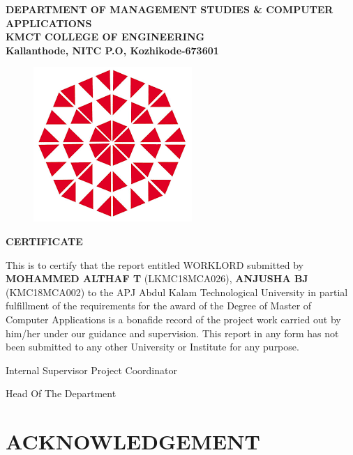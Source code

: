 \documentclass[a4paper,12pt]{report}
\begin{document}
\pagebreak

\begin{center}
	
\textbf{
\vspace*{8pt}
DEPARTMENT OF MANAGEMENT STUDIES \& COMPUTER
\vspace*{8pt}
APPLICATIONS\\
KMCT COLLEGE OF ENGINEERING\\
\vspace*{8pt}
Kallanthode, NITC P.O, Kozhikode-673601
}

\begin{figure}[bph]
	\centering
	\includegraphics[width=0.3023\linewidth]{kmct}
	\label{fig:ksblogo}
\end{figure}
\end{center}

{\centering \bf \large
	CERTIFICATE\par
}
\vspace*{10pt}
This is to certify that the report entitled WORKLORD submitted
by {\bf MOHAMMED ALTHAF T} (LKMC18MCA026), {\bf ANJUSHA BJ}
(KMC18MCA002) to the APJ Abdul Kalam Technological University
in partial fulfillment of the requirements for the award of the Degree of Master of Computer
Applications is a bonafide record of the project work carried out by him/her under our guidance and
supervision. This report in any form has not been submitted to any other University or Institute for
any purpose.

\begin{center}\vspace*{20pt}
	Internal Supervisor \hspace*{0pt} \hfill  Project Coordinator
\end{center}

\begin{center}\vspace*{40pt}
 \hfill  Head Of The Department
\end{center}
	
\pagebreak

\section*{\centering \bf \large ACKNOWLEDGEMENT}
\end{document}
